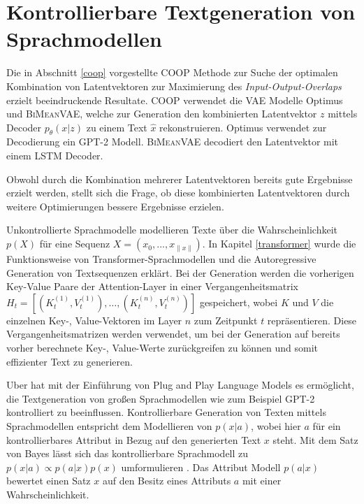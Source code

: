 \section{Kontrollierbare Textgeneration von Sprachmodellen}\raggedbottom
Die in Abschnitt \ref{coop} vorgestellte COOP Methode zur Suche der optimalen Kombination von Latentvektoren zur Maximierung des \textit{Input-Output-Overlaps} erzielt beeindruckende Resultate.
COOP verwendet die VAE Modelle Optimus und \textsc{BiMeanVAE}, welche zur Generation den kombinierten Latentvektor $z$ mittels Decoder $p_\theta(x|z)$ zu einem Text $\hat{x}$ rekonstruieren.
Optimus verwendet zur Decodierung ein GPT-2 Modell. \textsc{BiMeanVAE} decodiert den Latentvektor mit einem LSTM Decoder.

Obwohl durch die Kombination mehrerer Latentvektoren bereits gute Ergebnisse erzielt werden, stellt sich die Frage, ob diese kombinierten Latentvektoren durch weitere Optimierungen bessere Ergebnisse erzielen.

Unkontrollierte Sprachmodelle modellieren Texte über die Wahrscheinlichkeit $p(X)$ für eine Sequenz $X=(x_0,...,x_{\| x \|})$.
In Kapitel \ref{transformer} wurde die Funktionsweise von Transformer-Sprachmodellen und die Autoregressive Generation von Textsequenzen erklärt. 
Bei der Generation werden die vorherigen Key-Value Paare der Attention-Layer in einer Vergangenheitsmatrix $H_t = [(K_t^{(1)},V_t^{(1)}), \ldots , (K_t^{(n)},V_t^{(n)})]$ gespeichert, wobei $K$ und $V$ die einzelnen Key-, Value-Vektoren im Layer $n$ zum Zeitpunkt $t$ repräsentieren. %
Diese Vergangenheitsmatrizen werden verwendet, um bei der Generation auf bereits vorher berechnete Key-, Value-Werte zurückgreifen zu können und somit effizienter Text zu generieren.


Uber hat mit der Einführung von Plug and Play Language Models \citep{DBLP:journals/corr/abs-1912-02164} es ermöglicht, die Textgeneration von großen Sprachmodellen wie zum Beispiel GPT-2 kontrolliert zu beeinflussen.
Kontrollierbare Generation von Texten mittels Sprachmodellen entspricht dem Modellieren von $p(x|a)$, wobei hier $a$ für ein kontrollierbares Attribut in Bezug auf den generierten Text $x$ steht. 
Mit dem Satz von Bayes lässt sich das kontrollierbare Sprachmodell zu $p(x|a)\propto p(a|x)p(x)$ umformulieren \citep{DBLP:journals/corr/abs-1912-02164}. 
Das Attribut Modell $p(a|x)$ bewertet einen Satz $x$ auf den Besitz eines Attributs $a$ mit einer Wahrscheinlichkeit.


